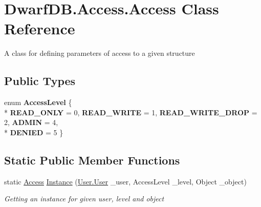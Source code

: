 \hypertarget{class_dwarf_d_b_1_1_access_1_1_access}{\section{Dwarf\+D\+B.\+Access.\+Access Class Reference}
\label{class_dwarf_d_b_1_1_access_1_1_access}
}


A class for defining parameters of access to a given structure  


\subsection*{Public Types}
\begin{DoxyCompactItemize}
\item 
\hypertarget{class_dwarf_d_b_1_1_access_1_1_access_ae5067899948333d1f76002804197086c}{enum {\bfseries Access\+Level} \{ \\*
{\bfseries R\+E\+A\+D\+\_\+\+O\+N\+L\+Y} = 0, 
{\bfseries R\+E\+A\+D\+\_\+\+W\+R\+I\+T\+E} = 1, 
{\bfseries R\+E\+A\+D\+\_\+\+W\+R\+I\+T\+E\+\_\+\+D\+R\+O\+P} = 2, 
{\bfseries A\+D\+M\+I\+N} = 4, 
\\*
{\bfseries D\+E\+N\+I\+E\+D} = 5
 \}}\label{class_dwarf_d_b_1_1_access_1_1_access_ae5067899948333d1f76002804197086c}

\end{DoxyCompactItemize}
\subsection*{Static Public Member Functions}
\begin{DoxyCompactItemize}
\item 
static \hyperlink{class_dwarf_d_b_1_1_access_1_1_access}{Access} \hyperlink{class_dwarf_d_b_1_1_access_1_1_access_a0d73d4aa26180df66d7618931b003123}{Instance} (\hyperlink{class_dwarf_d_b_1_1_user_1_1_user}{User.\+User} \+\_\+user, Access\+Level \+\_\+level, Object \+\_\+object)
\begin{DoxyCompactList}\small\item\em Getting an instance for given user, level and object \end{DoxyCompactList}\end{DoxyCompactItemize}
